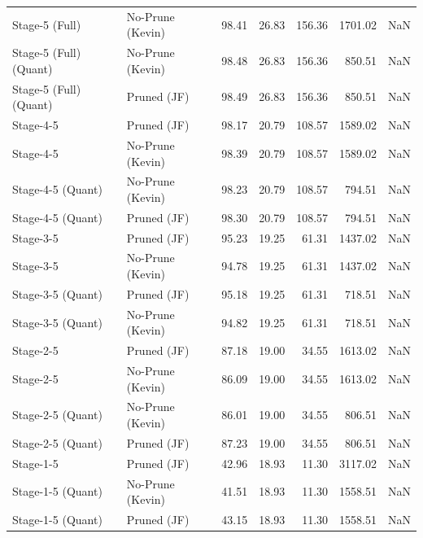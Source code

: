 \begin{table}
\begin{tabular}{llrrrrl}
Stage-5 (Full) & No-Prune (Kevin) & 98.41 & 26.83 & 156.36 & 1701.02 & NaN \\
Stage-5 (Full)
(Quant) & No-Prune (Kevin) & 98.48 & 26.83 & 156.36 & 850.51 & NaN \\
Stage-5 (Full)
(Quant) & Pruned (JF) & 98.49 & 26.83 & 156.36 & 850.51 & NaN \\
Stage-4-5 & Pruned (JF) & 98.17 & 20.79 & 108.57 & 1589.02 & NaN \\
Stage-4-5 & No-Prune (Kevin) & 98.39 & 20.79 & 108.57 & 1589.02 & NaN \\
Stage-4-5
(Quant) & No-Prune (Kevin) & 98.23 & 20.79 & 108.57 & 794.51 & NaN \\
Stage-4-5
(Quant) & Pruned (JF) & 98.30 & 20.79 & 108.57 & 794.51 & NaN \\
Stage-3-5 & Pruned (JF) & 95.23 & 19.25 & 61.31 & 1437.02 & NaN \\
Stage-3-5 & No-Prune (Kevin) & 94.78 & 19.25 & 61.31 & 1437.02 & NaN \\
Stage-3-5
(Quant) & Pruned (JF) & 95.18 & 19.25 & 61.31 & 718.51 & NaN \\
Stage-3-5
(Quant) & No-Prune (Kevin) & 94.82 & 19.25 & 61.31 & 718.51 & NaN \\
Stage-2-5 & Pruned (JF) & 87.18 & 19.00 & 34.55 & 1613.02 & NaN \\
Stage-2-5 & No-Prune (Kevin) & 86.09 & 19.00 & 34.55 & 1613.02 & NaN \\
Stage-2-5
(Quant) & No-Prune (Kevin) & 86.01 & 19.00 & 34.55 & 806.51 & NaN \\
Stage-2-5
(Quant) & Pruned (JF) & 87.23 & 19.00 & 34.55 & 806.51 & NaN \\
Stage-1-5 & Pruned (JF) & 42.96 & 18.93 & 11.30 & 3117.02 & NaN \\
Stage-1-5
(Quant) & No-Prune (Kevin) & 41.51 & 18.93 & 11.30 & 1558.51 & NaN \\
Stage-1-5
(Quant) & Pruned (JF) & 43.15 & 18.93 & 11.30 & 1558.51 & NaN \\
\bottomrule
\end{tabular}
\end{table}
